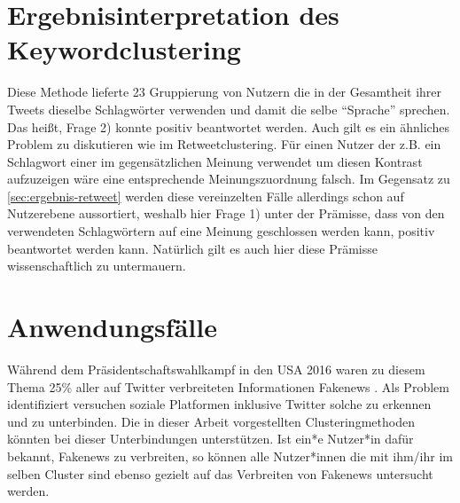 \section{Ergebnisinterpretation des Keywordclustering}
Diese Methode lieferte 23 Gruppierung von Nutzern die in der Gesamtheit ihrer Tweets dieselbe Schlagwörter verwenden und damit die selbe "`Sprache"' sprechen. Das heißt, Frage 2) konnte positiv beantwortet werden. Auch gilt es  ein ähnliches Problem zu diskutieren wie im Retweetclustering. Für einen Nutzer der z.B. ein Schlagwort einer im gegensätzlichen Meinung verwendet um diesen Kontrast aufzuzeigen wäre eine entsprechende Meinungszuordnung falsch.
Im Gegensatz zu \ref{sec:ergebnis-retweet} werden diese vereinzelten Fälle allerdings schon auf Nutzerebene aussortiert, weshalb hier Frage 1) unter der Prämisse, dass von den verwendeten Schlagwörtern auf eine Meinung geschlossen werden kann, positiv beantwortet werden kann.
Natürlich gilt es auch hier diese Prämisse wissenschaftlich zu untermauern.

\section{Anwendungsfälle}
Während dem Präsidentschaftswahlkampf in den USA 2016 waren zu diesem Thema 25\% aller auf Twitter verbreiteten Informationen \gls{Fakenews} \cite{fake-news}.
Als Problem identifiziert versuchen soziale Platformen inklusive Twitter solche zu erkennen und zu unterbinden. 
Die in dieser Arbeit vorgestellten Clusteringmethoden könnten bei dieser Unterbindungen unterstützen. Ist ein*e Nutzer*in dafür bekannt, Fakenews zu verbreiten, so können alle Nutzer*innen die mit ihm/ihr im selben Cluster sind ebenso gezielt auf das Verbreiten von Fakenews untersucht werden. 
